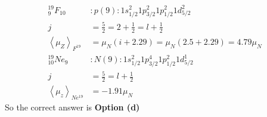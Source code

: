 \begin{enumerate}
\begin{answer}
\begin{align*}
	{ }_{9}^{19} F_{10}&: p(9): 1 s_{1 / 2}^{2} 1 p_{3 / 2}^{2} 1 p_{1 / 2}^{2} 1 d_{5 / 2}^{2}\\
	j&=\frac{5}{2}=2+\frac{1}{2}=l+\frac{1}{2}\\
	\left\langle\mu_{Z}\right\rangle_{F^{19}}&=\mu_{N}(i+2.29)=\mu_{N}(2.5+2.29)=4.79 \mu_{N} \\
	{ }_{10}^{19} N e_{9}&: N(9): 1 s_{1 / 2}^{2} 1 p_{3 / 2}^{4} 1 p_{1 / 2}^{2} 1 d_{5 / 2}^{1} \\
	j&=\frac{5}{2}=l+\frac{1}{2}\\
	\left\langle\mu_{z}\right\rangle_{N e^{19}}&=-1.91 \mu_{N}
	\end{align*}
		So the correct answer is \textbf{Option (d)}
\end{answer}








\end{enumerate}
